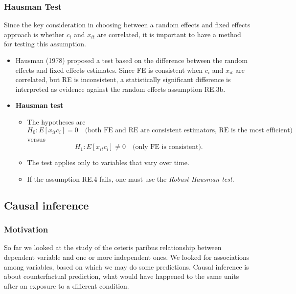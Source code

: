 \subsubsection{Hausman Test}



Since the key consideration in choosing between a random effects and fixed effects
approach is whether $c_i$ and $x_{it}$ are correlated, it is important to have a method for testing
this assumption.

\begin{itemize}
    \item Hausman (1978) proposed a test based on the difference between the random effects and
    fixed effects estimates. Since FE is consistent when $c_i$ and $x_{it}$ are correlated, but RE is
    inconsistent, a statistically significant difference is interpreted as evidence against the
    random effects assumption RE.3b.

    \item \textbf{Hausman test}
    \begin{itemize}
        \item The hypotheses are
        \[
        H_0: E[x_{it} c_i] = 0 \quad \text{(both FE and RE are consistent estimators, RE is the most efficient)}
        \]
        versus
        \[
        H_1: E[x_{it} c_i] \neq 0 \quad \text{(only FE is consistent)}.
        \]

        \item The test applies only to variables that vary over time.

        \item If the assumption RE.4 fails, one must use the \textit{Robust Hausman test}.
    \end{itemize}
\end{itemize}

\subsection{Causal inference}


\subsubsection{Motivation}

So far we looked at the study of the ceteris paribus relationship between dependent variable and one or more independent ones. We looked for associations among variables, based on which we may do some predictions. Causal inference is about counterfactual prediction, what would have happened to the same units after an exposure to a different condition. 

